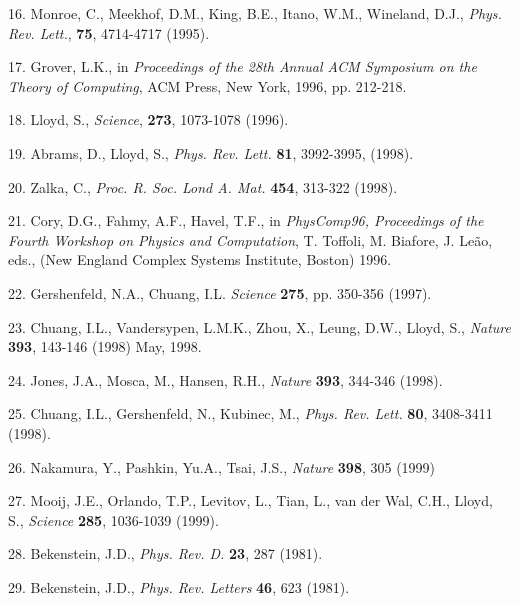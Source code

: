 \item{16.} Monroe, C., Meekhof, D.M., King, B.E., Itano, W.M., 
Wineland, D.J., {\it Phys. Rev. Lett.}, {\bf 75}, 4714-4717 (1995).

\item{17.} Grover, L.K., in {\it Proceedings of the 28th Annual ACM Symposium
on the Theory of Computing}, ACM Press, New York, 1996, pp. 212-218.

\item{18.} Lloyd, S.,  {\it Science}, {\bf 273}, 1073-1078 (1996).

\item{19.} Abrams, D., Lloyd, S.,  {\it Phys. Rev. Lett.} {\bf 81},
3992-3995, (1998).
 
\item{20.} Zalka, C., {\it Proc. R. Soc. Lond A. Mat.} {\bf 454}, 
313-322 (1998).

\item{21.} Cory, D.G., Fahmy, A.F., Havel, T.F., 
in {\it PhysComp96, Proceedings of the
Fourth Workshop on Physics and Computation}, T. Toffoli, M. Biafore,
J. Le\~ao, eds., (New England Complex Systems Institute, Boston) 1996.

\item{22.} Gershenfeld, N.A., Chuang, I.L. 
{\it Science} {\bf 275}, pp. 350-356
(1997).

\item{23.} Chuang, I.L., Vandersypen, L.M.K.,
Zhou, X., Leung, D.W., Lloyd, S., {\it Nature} {\bf 393},
143-146 (1998) May, 1998.

\item{24.} Jones, J.A., Mosca, M., Hansen, R.H., {\it Nature}
{\bf 393}, 344-346 (1998). 

\item{25.} Chuang, I.L., Gershenfeld, N., Kubinec, M., {\it Phys. Rev.
Lett.} {\bf 80}, 3408-3411 (1998).

\item{26.} Nakamura, Y., Pashkin, Yu.A., Tsai, J.S., {\it Nature}
{\bf 398}, 305 (1999)

\item{27.} Mooij, J.E., Orlando, T.P., Levitov, L., Tian, L.,
van der Wal, C.H., Lloyd, S., {\it Science} {\bf 285}, 1036-1039
(1999).

\item{28.} Bekenstein, J.D., {\it Phys. Rev. D.} {\bf 23}, 287 (1981).

\item{29.} Bekenstein, J.D., {\it Phys. Rev. Letters\/} {\bf 46}, 623 (1981).


